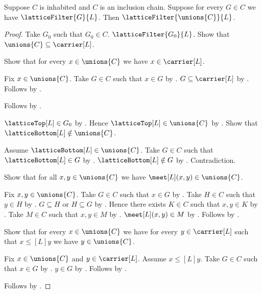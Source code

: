 \begin{theorem}\label{inhabited_chain_union_is_lattice_filter}
    Suppose $C$ is inhabited and $C$ is an inclusion chain.
    Suppose for every $G\in C$ we have $\latticeFilter{G}{L}$.
    Then $\latticeFilter{\unions{C}}{L}$.
\end{theorem}
\begin{proof}
    Take $G_0$ such that $G_0\in C$.
    $\latticeFilter{G_0}{L}$.
    Show that $\unions{C}\subseteq\carrier[L]$.
    \begin{subproof}
        Show that for every $x\in\unions{C}$ we have
            $x\in\carrier[L]$.
        \begin{subproof}
            Fix $x\in\unions{C}$.
            Take $G\in C$ such that $x\in G$ by .
            $G\subseteq\carrier[L]$ by
                .
            Follows by .
        \end{subproof}
        Follows by .
    \end{subproof}
    $\latticeTop[L]\in G_0$ by .
    Hence $\latticeTop[L]\in\unions{C}$ by .
    Show that $\latticeBottom[L]\notin\unions{C}$.
    \begin{subproof}
        Assume $\latticeBottom[L]\in\unions{C}$.
        Take $G\in C$ such that $\latticeBottom[L]\in G$ by
            .
        $\latticeBottom[L]\notin G$ by
            .
        Contradiction.
    \end{subproof}
    Show that for all $x,y\in\unions{C}$ we have
        $\meet[L](x,y)\in\unions{C}$.
    \begin{subproof}
        Fix $x,y\in\unions{C}$.
        Take $G\in C$ such that $x\in G$ by .
        Take $H\in C$ such that $y\in H$ by .
        $G\subseteq H$ or $H\subseteq G$ by .
        Hence there exists $K\in C$ such that $x,y\in K$ by
            .
        Take $M\in C$ such that $x,y\in M$ by \auto.
        $\meet[L](x,y)\in M$ by .
        Follows by .
    \end{subproof}
    Show that for every $x\in\unions{C}$ we have
        for every $y\in\carrier[L]$ such that
            $x\mathrel{\leq[L]}y$ we have $y\in\unions{C}$.
    \begin{subproof}
        Fix $x\in\unions{C}$ and $y\in\carrier[L]$.
        Assume $x\mathrel{\leq[L]}y$.
        Take $G\in C$ such that $x\in G$ by .
        $y\in G$ by .
        Follows by .
    \end{subproof}
    Follows by .
\end{proof}

